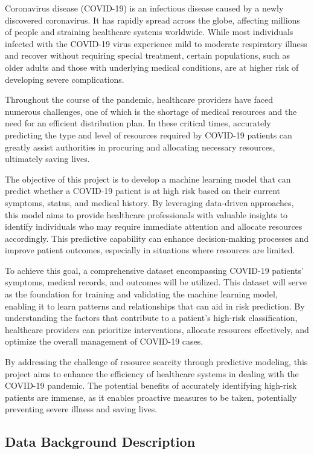 \documentclass[
  journal=medium,
  manuscript=Report,
  year=2023,
  volume=37,
]{cup-journal}
\begin{document}
Coronavirus disease (COVID-19) is an infectious disease caused by a newly discovered coronavirus. It has rapidly spread across the globe, affecting millions of people and straining healthcare systems worldwide. While most individuals infected with the COVID-19 virus experience mild to moderate respiratory illness and recover without requiring special treatment, certain populations, such as older adults and those with underlying medical conditions, are at higher risk of developing severe complications.

Throughout the course of the pandemic, healthcare providers have faced numerous challenges, one of which is the shortage of medical resources and the need for an efficient distribution plan. In these critical times, accurately predicting the type and level of resources required by COVID-19 patients can greatly assist authorities in procuring and allocating necessary resources, ultimately saving lives.

The objective of this project is to develop a machine learning model that can predict whether a COVID-19 patient is at high risk based on their current symptoms, status, and medical history. By leveraging data-driven approaches, this model aims to provide healthcare professionals with valuable insights to identify individuals who may require immediate attention and allocate resources accordingly. This predictive capability can enhance decision-making processes and improve patient outcomes, especially in situations where resources are limited.

To achieve this goal, a comprehensive dataset encompassing COVID-19 patients' symptoms, medical records, and outcomes will be utilized. This dataset will serve as the foundation for training and validating the machine learning model, enabling it to learn patterns and relationships that can aid in risk prediction. By understanding the factors that contribute to a patient's high-risk classification, healthcare providers can prioritize interventions, allocate resources effectively, and optimize the overall management of COVID-19 cases.

By addressing the challenge of resource scarcity through predictive modeling, this project aims to enhance the efficiency of healthcare systems in dealing with the COVID-19 pandemic. The potential benefits of accurately identifying high-risk patients are immense, as it enables proactive measures to be taken, potentially preventing severe illness and saving lives.

\subsection{Data Background Description}
\end{document}
